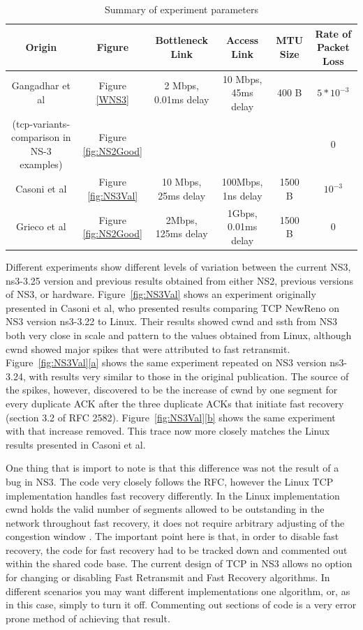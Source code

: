 \documentclass[11pt]{ucthesis}
\begin{document}
\begin{table}[!t]
\renewcommand{\arraystretch}{1.3}
\caption{Summary of experiment parameters} 
\label{table:exps}
\centering
\begin{tabular}{|c||c||c||c||c||c|}
\hline
\textbf{Origin} & \textbf{Figure} & \textbf{Bottleneck Link} & \textbf{Access Link} & \textbf{MTU Size} & \textbf{Rate of Packet Loss}\\ 
\hline
Gangadhar et al\cite{NS3W} & Figure \ref{WNS3} & 2 Mbps, 0.01ms delay & 10 Mbps, 45ms delay & 400 B & $5*10^{-3}$\\
(tcp-variants-comparison in NS-3 examples) & Figure \ref{fig:NS2Good} &  &  &  & 0 \\
\hline
Casoni et al\cite{NS3Val} & Figure \ref{fig:NS3Val} & 10 Mbps, 25ms delay & 100Mbps, 1ns delay & 1500 B & $10^{-3}$\\
\hline
Grieco et al\cite{NS2WP} & Figure \ref{fig:NS2Good} & 2Mbps, 125ms delay & 1Gbps, 0.01ms delay & 1500 B & 0 \\
\hline
\end{tabular}
\end{table}

Different experiments show different levels of variation between the current NS3, ns3-3.25 version and previous results obtained from either NS2, previous versions of NS3, or hardware. Figure~\ref{fig:NS3Val} shows an experiment originally presented in Casoni et al\cite{NS3Val}, who presented results comparing TCP NewReno on NS3 version ns3-3.22 to Linux. Their results showed cwnd and ssth from NS3 both very close in scale and pattern to the values obtained from Linux, although cwnd showed major spikes that were attributed to fast retransmit. Figure~\ref{fig:NS3Val}\ref{a} shows the same experiment repeated on NS3 version ns3-3.24, with results very similar to those in the original publication. The source of the spikes, however, discovered to be the increase of cwnd by one segment for every duplicate ACK after the three duplicate ACKs that initiate fast recovery (section 3.2 of RFC 2582\cite{RFC2582}). Figure~\ref{fig:NS3Val}\ref{b} shows the same experiment with that increase removed. This trace now more closely matches the Linux results presented in Casoni et al\cite{NS3Val}.

One thing that is import to note is that this difference was not the result of a bug in NS3. The code very closely follows the RFC, however the Linux TCP implementation handles fast recovery differently. In the Linux implementation cwnd holds the valid number of segments allowed to be outstanding in the network throughout fast recovery, it does not require arbitrary adjusting of the congestion window \cite{NS3Val} \cite{LinuxTCP}. The important point here is that, in order to disable fast recovery, the code for fast recovery had to be tracked down and commented out within the shared code base. The current design of TCP in NS3 allows no option for changing or disabling Fast Retransmit and Fast Recovery algorithms. In different scenarios you may want different implementations one algorithm, or, as in this case, simply to turn it off. Commenting out sections of code is a very error prone method of achieving that result. 
\end{document}
